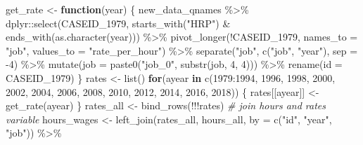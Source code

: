 \documentclass{article}
\newenvironment{Shaded}{\begin{snugshade}}{\end{snugshade}}
\newcommand{\AttributeTok}[1]{\textcolor[rgb]{0.77,0.63,0.00}{#1}}
\newcommand{\CommentTok}[1]{\textcolor[rgb]{0.56,0.35,0.01}{\textit{#1}}}
\newcommand{\ControlFlowTok}[1]{\textcolor[rgb]{0.13,0.29,0.53}{\textbf{#1}}}
\newcommand{\DecValTok}[1]{\textcolor[rgb]{0.00,0.00,0.81}{#1}}
\newcommand{\FunctionTok}[1]{\textcolor[rgb]{0.00,0.00,0.00}{#1}}
\newcommand{\NormalTok}[1]{#1}
\newcommand{\OtherTok}[1]{\textcolor[rgb]{0.56,0.35,0.01}{#1}}
\newcommand{\SpecialCharTok}[1]{\textcolor[rgb]{0.00,0.00,0.00}{#1}}
\newcommand{\StringTok}[1]{\textcolor[rgb]{0.31,0.60,0.02}{#1}}
\begin{document}
\begin{Shaded}
\begin{Highlighting}[]
\NormalTok{get\_rate }\OtherTok{\textless{}{-}} \ControlFlowTok{function}\NormalTok{(year) \{}
\NormalTok{  new\_data\_qnames }\SpecialCharTok{\%\textgreater{}\%}
\NormalTok{    dplyr}\SpecialCharTok{::}\FunctionTok{select}\NormalTok{(CASEID\_1979,}
                  \FunctionTok{starts\_with}\NormalTok{(}\StringTok{"HRP"}\NormalTok{) }\SpecialCharTok{\&}
                    \FunctionTok{ends\_with}\NormalTok{(}\FunctionTok{as.character}\NormalTok{(year))) }\SpecialCharTok{\%\textgreater{}\%}
    \FunctionTok{pivot\_longer}\NormalTok{(}\SpecialCharTok{!}\NormalTok{CASEID\_1979, }\AttributeTok{names\_to =} \StringTok{"job"}\NormalTok{, }\AttributeTok{values\_to =} \StringTok{"rate\_per\_hour"}\NormalTok{) }\SpecialCharTok{\%\textgreater{}\%}
    \FunctionTok{separate}\NormalTok{(}\StringTok{"job"}\NormalTok{, }\FunctionTok{c}\NormalTok{(}\StringTok{"job"}\NormalTok{, }\StringTok{"year"}\NormalTok{), }\AttributeTok{sep =} \SpecialCharTok{{-}}\DecValTok{4}\NormalTok{) }\SpecialCharTok{\%\textgreater{}\%}
    \FunctionTok{mutate}\NormalTok{(}\AttributeTok{job =} \FunctionTok{paste0}\NormalTok{(}\StringTok{"job\_0"}\NormalTok{, }\FunctionTok{substr}\NormalTok{(job, }\DecValTok{4}\NormalTok{, }\DecValTok{4}\NormalTok{))) }\SpecialCharTok{\%\textgreater{}\%}
    \FunctionTok{rename}\NormalTok{(}\AttributeTok{id =}\NormalTok{ CASEID\_1979)}
\NormalTok{\}}
\NormalTok{rates }\OtherTok{\textless{}{-}} \FunctionTok{list}\NormalTok{()}
\ControlFlowTok{for}\NormalTok{(ayear }\ControlFlowTok{in} \FunctionTok{c}\NormalTok{(}\DecValTok{1979}\SpecialCharTok{:}\DecValTok{1994}\NormalTok{, }\DecValTok{1996}\NormalTok{, }\DecValTok{1998}\NormalTok{, }\DecValTok{2000}\NormalTok{, }\DecValTok{2002}\NormalTok{, }\DecValTok{2004}\NormalTok{, }\DecValTok{2006}\NormalTok{, }\DecValTok{2008}\NormalTok{, }\DecValTok{2010}\NormalTok{,}
               \DecValTok{2012}\NormalTok{, }\DecValTok{2014}\NormalTok{, }\DecValTok{2016}\NormalTok{, }\DecValTok{2018}\NormalTok{)) \{}
\NormalTok{  rates[[ayear]] }\OtherTok{\textless{}{-}} \FunctionTok{get\_rate}\NormalTok{(ayear)}
\NormalTok{\}}
\NormalTok{rates\_all }\OtherTok{\textless{}{-}} \FunctionTok{bind\_rows}\NormalTok{(}\SpecialCharTok{!!!}\NormalTok{rates)}
\CommentTok{\# join hours and rates variable}
\NormalTok{hours\_wages }\OtherTok{\textless{}{-}} \FunctionTok{left\_join}\NormalTok{(rates\_all,}
\NormalTok{                         hours\_all,}
                         \AttributeTok{by =} \FunctionTok{c}\NormalTok{(}\StringTok{"id"}\NormalTok{, }\StringTok{"year"}\NormalTok{, }\StringTok{"job"}\NormalTok{)) }\SpecialCharTok{\%\textgreater{}\%}

\end{Highlighting}
\end{Shaded}
\end{document}
